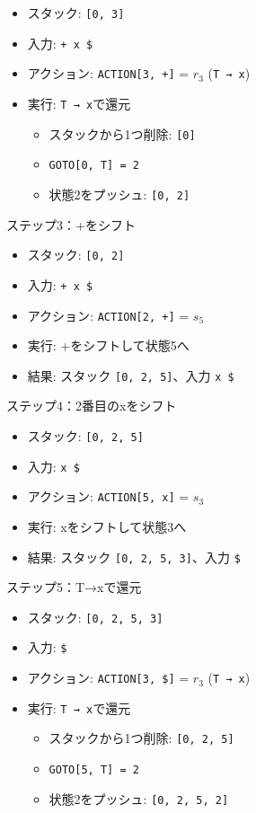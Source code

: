 \begin{itemize}
\item
  スタック: \texttt{{[}0,\ 3{]}}
\item
  入力: \texttt{+ x \$}
\item
  アクション: \texttt{ACTION{[}3,\ +{]}} = \(r_3\) (\texttt{T\ →\ x})
\item
  実行: \texttt{T\ →\ x}で還元

  \begin{itemize}
  \item
    スタックから1つ削除: \texttt{{[}0{]}}
  \item
    \texttt{GOTO{[}0,\ T{]}\ =\ 2}
  \item
    状態2をプッシュ: \texttt{{[}0,\ 2{]}}
  \end{itemize}
\end{itemize}

ステップ3：+をシフト

\begin{itemize}
\item
  スタック: \texttt{{[}0,\ 2{]}}
\item
  入力: \texttt{+ x \$}
\item
  アクション: \texttt{ACTION{[}2,\ +{]}} = \(s_5\)
\item
  実行: +をシフトして状態5へ
\item
  結果: スタック \texttt{{[}0,\ 2,\ 5{]}}、入力 \texttt{x\ \$}
\end{itemize}

ステップ4：2番目のxをシフト

\begin{itemize}
\item
  スタック: \texttt{{[}0,\ 2,\ 5{]}}
\item
  入力: \texttt{x\ \$}
\item
  アクション: \texttt{ACTION{[}5,\ x{]}} = \(s_3\)
\item
  実行: xをシフトして状態3へ
\item
  結果: スタック \texttt{{[}0,\ 2,\ 5,\ 3{]}}、入力 \texttt{\$}
\end{itemize}

ステップ5：T→xで還元

\begin{itemize}
\item
  スタック: \texttt{{[}0,\ 2,\ 5,\ 3{]}}
\item
  入力: \texttt{\$}
\item
  アクション: \texttt{ACTION{[}3,\ \${]}} = \(r_3\) (\texttt{T\ →\ x})
\item
  実行: \texttt{T\ →\ x}で還元

  \begin{itemize}
  \item
    スタックから1つ削除: \texttt{{[}0,\ 2,\ 5{]}}
  \item
    \texttt{GOTO{[}5,\ T{]}\ =\ 2}
  \item
    状態2をプッシュ: \texttt{{[}0,\ 2,\ 5,\ 2{]}}
  \end{itemize}
\end{itemize}

